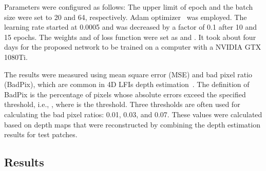 \documentclass[]{spie}
\newcommand{\jtextd}[1]{}
\begin{document}
Parameters were configured as follows: 
The upper limit of epoch and the batch size were set to 20 and 64, respectively.
Adam optimizer~\cite{kingma2014adam} was employed.
The learning rate started at 0.0005 and was decreased by 
a factor of 0.1 after 10 and 15 epochs.
The weights  and  of loss function  were
set as  and .
It took about four days for the proposed network to be trained on a
computer with a NVIDIA GTX 1080Ti.


\jtextd{
  提案手法の評価には，
  4D LFIs奥行き推定で一般的に適用される指標である，
  平均二乗誤差（Mean Square Error: MSE）と不良画素比（BadPix）を使用した~\cite{honauer2016benchmark}．
BadPixの定義は，絶対誤差が指定された閾値を超える，
  すなわち，を満たす画素の比率である．
  ここでは閾値であり，BadPixの計算には3つの閾値（0.07，0.03，0.01）がよく用いられる．
}

The results were measured
using mean square error (MSE) and bad pixel ratio (BadPix),
which are common in 4D LFIs depth estimation~\cite{honauer2016benchmark}.
The definition of BadPix is the percentage of pixels 
whose absolute errors exceed the specified threshold, 
i.e., , 
where  is the threshold.
Three thresholds are often used for calculating 
the bad pixel ratios: 0.01, 0.03, and 0.07.
These values were calculated based on  depth maps that
were reconstructed by combining the depth estimation results for test
patches.



\jtextd{
  本研究における評価では，各テストパッチから奥行きを推定し，空間軸に沿って結合した後，
  の空間分解能を持つ奥行きマップを用いて
  各評価指標を計算したことに注意されたい．
}



\subsection{Results}
\end{document}
